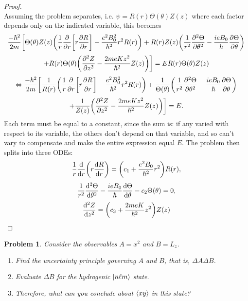 \documentclass{article}
\newtheorem{plm}{Problem}
\begin{document}
\begin{proof}
\[\]
  Assuming the problem separates, i.e. $\psi = R(r)\Theta(\theta)Z(z)$ where each factor depends only on the indicated variable, this becomes
  \[
    \frac{-\hbar^{2}}{2m}\bigg[\Theta(\theta)Z(z)\qty(\frac{1}{r}\pdv{r}\qty[r\pdv{R}{r}] - \frac{e^{2}B_{0}^{2}}{\hbar^{2}}r^{2}R(r))
    + R(r)Z(z)\qty(\frac{1}{r^{2}}\pdv[2]{\Theta}{\theta} -\frac{ieB_{0}}{\hbar}\pdv{\Theta}{\theta})
  \]
  \[
    + R(r)\Theta(\theta)\qty(\pdv[2]{Z}{z} - \frac{2meKz^{2}}{\hbar^{2}}Z(z))\bigg]  = ER(r)\Theta(\theta)Z(z)
  \]
  \[
    \Leftrightarrow
    \frac{-\hbar^{2}}{2m}\bigg[\frac{1}{R(r)}\qty(\frac{1}{r}\pdv{r}\qty[r\pdv{R}{r}] - \frac{e^{2}B_{0}^{2}}{\hbar^{2}}r^{2}R(r))
    + \frac{1}{\Theta(\theta)}\qty(\frac{1}{r^{2}}\pdv[2]{\Theta}{\theta} -\frac{ieB_{0}}{\hbar}\pdv{\Theta}{\theta})
  \]
  \[
    + \frac{1}{Z(z)}\qty(\pdv[2]{Z}{z} - \frac{2meKz^{2}}{\hbar^{2}}Z(z))\bigg]  = E.
  \]
  Each term must be equal to a constant, since the sum is: if any varied with respect to its variable, the others don't depend on that variable,
  and so can't vary to compensate and make the entire expression equal $E$.
  The problem then splits into three ODEs:
  \[
    \frac{1}{r}\dv{r}\qty(r\dv{R}{r}) = \qty(c_{1} + \frac{e^{2}B_{0}}{\hbar^{2}}r^{2})R(r),
  \]
  \[
    \frac{1}{r^{2}}\dv[2]{\Theta}{\theta} - \frac{ieB_{0}}{\hbar}\dv{\Theta}{\theta} - c_{2}\Theta(\theta) = 0,
  \]
  \[
    \dv[2]{Z}{z} = \qty(c_{3} + \frac{2meK}{\hbar^{2}}z^{2})Z(z)
  \]
\end{proof}

\begin{plm}
  Consider the observables $A = x^{2}$ and $B = L_{z}$.
  \begin{enumerate}
  \item Find the uncertainty principle governing $A$ and $B$, that is, $\Delta A\Delta B$.
  \item Evaluate $\Delta B$ for the hydrogenic $\ket{n\ell m}$ state.
  \item Therefore, what can you conclude about $\expval{xy}$ in this state?
  \end{enumerate}
\end{plm}
\end{document}
